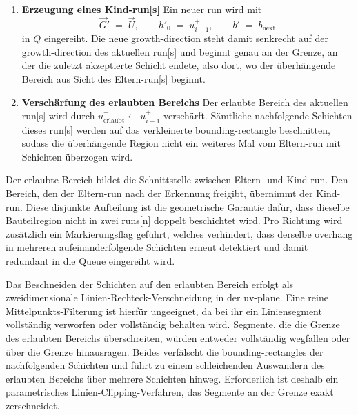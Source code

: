                 \begin{enumerate}
                    \item \textbf{{Erzeugung eines Kind-\gls{run}[s]}}
                    Ein neuer \gls{run} wird mit
                    \[
                        \vec{G}' \;=\; \vec{U}, \qquad
                        h'_0 \;=\; u^+_{i-1}, \qquad
                        b' \;=\; b_\text{next}
                    \]
                    in $Q$ eingereiht.
                    Die neue \gls{growth-direction} steht damit senkrecht auf der \gls{growth-direction} des aktuellen \gls{run}[s] und beginnt genau an der Grenze, an der die zuletzt akzeptierte Schicht endete, also dort, wo der überhängende Bereich aus Sicht des Eltern-\gls{run}[s] beginnt.

                    \item \textbf{Verschärfung des erlaubten Bereichs}
                    Der erlaubte Bereich des aktuellen \gls{run}[s] wird durch $u^+_\text{erlaubt} \leftarrow u^+_{i-1}$ verschärft.
                    Sämtliche nachfolgende Schichten dieses \gls{run}[s] werden auf das verkleinerte \gls{bounding-rectangle} beschnitten, sodass die überhängende Region nicht ein weiteres Mal vom Eltern-\gls{run} mit Schichten überzogen wird.
                \end{enumerate}

                Der erlaubte Bereich bildet die Schnittstelle zwischen Eltern- und Kind-\gls{run}.
                Den Bereich, den der Eltern-\gls{run} nach der Erkennung freigibt, übernimmt der Kind-\gls{run}.
                Diese disjunkte Aufteilung ist die geometrische Garantie dafür, dass dieselbe Bauteilregion nicht in zwei \glspl{run}[n] doppelt beschichtet wird.
                Pro Richtung wird zusätzlich ein Markierungsflag geführt, welches verhindert, dass derselbe \gls{overhang} in mehreren aufeinanderfolgende Schichten erneut detektiert und damit redundant in die Queue eingereiht wird.

                Das Beschneiden der Schichten auf den erlaubten Bereich erfolgt als zweidimensionale Linien-Rechteck-Verschneidung in der \gls{uv-plane}.
                Eine reine Mittelpunkts-Filterung ist hierfür ungeeignet, da bei ihr ein Liniensegment vollständig verworfen oder vollständig behalten wird.
                Segmente, die die Grenze des erlaubten Bereichs überschreiten, würden entweder vollständig wegfallen oder über die Grenze hinausragen.
                Beides verfälscht die \glspl{bounding-rectangle} der nachfolgenden Schichten und führt zu einem schleichenden Auswandern des erlaubten Bereichs über mehrere Schichten hinweg.
                Erforderlich ist deshalb ein parametrisches Linien-Clipping-Verfahren, das Segmente an der Grenze exakt zerschneidet.

